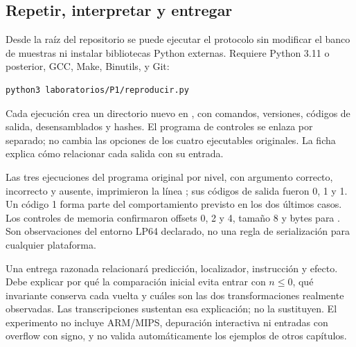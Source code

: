 \subsection{Repetir, interpretar y entregar}

Desde la raíz del repositorio se puede ejecutar el protocolo sin modificar el
banco de muestras ni instalar bibliotecas Python externas. Requiere Python 3.11
o posterior, GCC, Make, Binutils,  y Git:

\begin{lstlisting}[language=bash]
python3 laboratorios/P1/reproducir.py
\end{lstlisting}

Cada ejecución crea un directorio nuevo en ,
con comandos, versiones, códigos de salida, desensamblados y hashes. El programa
de controles se enlaza por separado; no cambia las opciones de los cuatro
ejecutables originales. La ficha  explica
cómo relacionar cada salida con su entrada.

Las tres ejecuciones del programa original por nivel, con argumento correcto,
incorrecto y ausente, imprimieron la línea
; sus códigos de salida fueron
0, 1 y 1. Un código 1 forma parte del comportamiento previsto en los dos últimos
casos. Los controles de memoria confirmaron offsets 0, 2 y 4, tamaño 8 y bytes
 para . Son observaciones del entorno
LP64 declarado, no una regla de serialización para cualquier plataforma.

Una entrega razonada relacionará predicción, localizador, instrucción y efecto.
Debe explicar por qué la comparación inicial evita entrar con $n\le0$, qué
invariante conserva cada vuelta y cuáles son las dos transformaciones realmente
observadas. Las transcripciones sustentan esa explicación; no la sustituyen.
El experimento no incluye ARM/MIPS, depuración interactiva ni entradas con
overflow con signo, y no valida automáticamente los ejemplos de otros capítulos.
